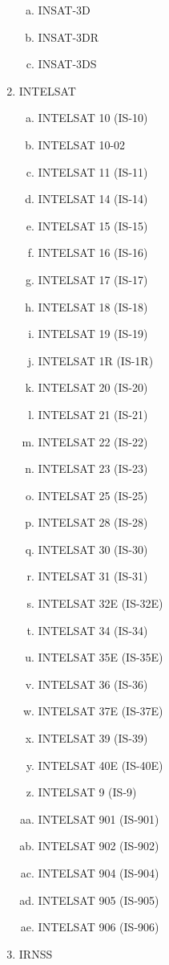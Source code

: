 \begin{multicols}{2}
\begin{enumerate}
\begin{enumerate}[a.]
    \item INSAT-3D
    \item INSAT-3DR
    \item INSAT-3DS
  \end{enumerate}
  \item INTELSAT
  \begin{enumerate}[a.]
    \item INTELSAT 10 (IS-10)
    \item INTELSAT 10-02
    \item INTELSAT 11 (IS-11)
    \item INTELSAT 14 (IS-14)
    \item INTELSAT 15 (IS-15)
    \item INTELSAT 16 (IS-16)
    \item INTELSAT 17 (IS-17)
    \item INTELSAT 18 (IS-18)
    \item INTELSAT 19 (IS-19)
    \item INTELSAT 1R (IS-1R)
    \item INTELSAT 20 (IS-20)
    \item INTELSAT 21 (IS-21)
    \item INTELSAT 22 (IS-22)
    \item INTELSAT 23 (IS-23)
    \item INTELSAT 25 (IS-25)
    \item INTELSAT 28 (IS-28)
    \item INTELSAT 30 (IS-30)
    \item INTELSAT 31 (IS-31)
    \item INTELSAT 32E (IS-32E)
    \item INTELSAT 34 (IS-34)
    \item INTELSAT 35E (IS-35E)
    \item INTELSAT 36 (IS-36)
    \item INTELSAT 37E (IS-37E)
    \item INTELSAT 39 (IS-39)
    \item INTELSAT 40E (IS-40E)
    \item INTELSAT 9 (IS-9)
    \item INTELSAT 901 (IS-901)
    \item INTELSAT 902 (IS-902)
    \item INTELSAT 904 (IS-904)
    \item INTELSAT 905 (IS-905)
    \item INTELSAT 906 (IS-906)
  \end{enumerate}
  \item IRNSS

\end{enumerate}
\end{multicols}
